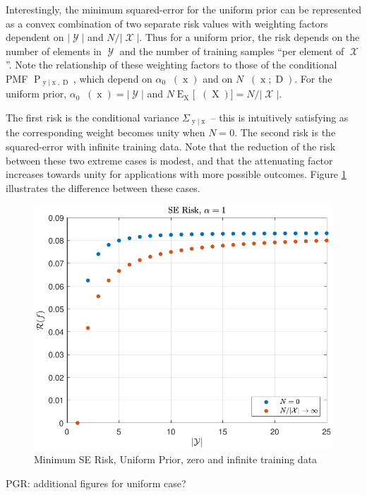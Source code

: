 \documentclass[12pt]{report}
\DeclareMathOperator{\xrm}{\mathrm{x}}
\DeclareMathOperator{\Xrm}{\mathrm{X}}
\DeclareMathOperator{\yrm}{\mathrm{y}}
\DeclareMathOperator{\Drm}{\mathrm{D}}
\DeclareMathOperator{\Prm}{\mathrm{P}}
\DeclareMathOperator{\Erm}{\mathrm{E}}
\DeclareMathOperator{\Xcal}{\mathcal{X}}
\DeclareMathOperator{\Ycal}{\mathcal{Y}}
\DeclareMathOperator{\Psim}{\Psi_\text{m}}
\DeclareMathOperator{\alpham}{\alpha_\text{m}}
\begin{document}
Interestingly, the minimum squared-error for the uniform prior can be represented as a convex combination of two separate risk values with weighting factors dependent on $|\Ycal|$ and $N/|\Xcal|$. Thus for a uniform prior, the risk depends on the number of elements in $\Ycal$ and the number of training samples ``per element of $\Xcal$''. Note the relationship of these weighting factors to those of the conditional PMF $\Prm_{\yrm | \xrm,\Drm}$, which depend on $\alpha_0 \alpham(\xrm)$ and on $N \Psim(\xrm;\Drm)$. For the uniform prior, $\alpha_0 \alpham(\xrm) = |\Ycal|$ and $N \Erm_{\Xrm}\big[ \Psim(\Xrm) \big] = N/|\Xcal|$.

The first risk is the conditional variance $\Sigma_{\yrm|\xrm}$ -- this is intuitively satisfying as the corresponding weight becomes unity when $N=0$. The second risk is the squared-error with infinite training data. Note that the reduction of the risk between these two extreme cases is modest, and that the attenuating factor increases towards unity for applications with more possible outcomes. Figure \ref{fig:Risk_SE_uniform_N_lim} illustrates the difference between these cases.

\begin{figure}
\centering
\includegraphics[width=0.7\linewidth]{Risk_SE_uniform_N_lim.pdf}
\caption{Minimum SE Risk, Uniform Prior, zero and infinite training data}
\label{fig:Risk_SE_uniform_N_lim}
\end{figure}


PGR: additional figures for uniform case?

%
%
\end{document}
